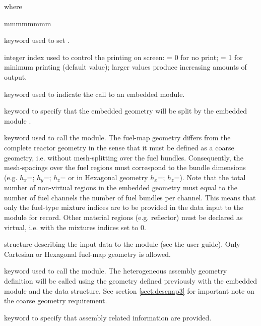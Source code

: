 \noindent where
\begin{ListeDeDescription}{mmmmmmmm}

\item[\moc{EDIT}] keyword used to set .

\item[\dusa{iprint}] integer index used to control the printing on screen:
 = 0 for no print; = 1 for minimum printing (default value); larger values
produce increasing amounts of output.

\item[\moc{:::}] keyword used to indicate the call to an embedded module.

\item[\moc{SPLIT-NAP:}] keyword to specify that the embedded geometry will be split by the embedded  module .

\item[\moc{GEO:}] keyword used to call the  module.
The fuel-map geometry differs from the complete reactor geometry
in the sense that it must be defined as a coarse geometry, i.e. without
mesh-splitting over the fuel bundles. Consequently, the mesh-spacings
over the fuel regions must correspond to the bundle dimensions (e.g.
$h_{x}$=; $h_{y}$=; $h_{z}$= or in
 Hexagonal geometry $h_{x}$=; $h_{z}$=).
Note that the total number of non-virtual regions in the embedded
geometry must equal to the number of fuel channels  the
number of fuel bundles per channel. This means that only the fuel-type
mixture indices are to be provided in the data input to the 
module for  record. Other material regions (e.g. reflector) must
be declared as virtual, i.e. with the mixtures indices set to 0.

\item[\dstr{descgeo}] structure describing the input data to the
 module (see the user guide\cite{dragon}).  Only
 Cartesian or  Hexagonal fuel-map geometry is allowed.

\item[\moc{NAP:}] keyword used to call the  module. The heterogeneous assembly geometry definition will be called using the geometry defined previously with the embedded module  and the  data structure. See section \ref{sect:descnap3} for important note on the coarse geometry requirement.

\item[\moc{ASSEMBLY}] keyword to specify that assembly related information are provided.


\end{ListeDeDescription}
